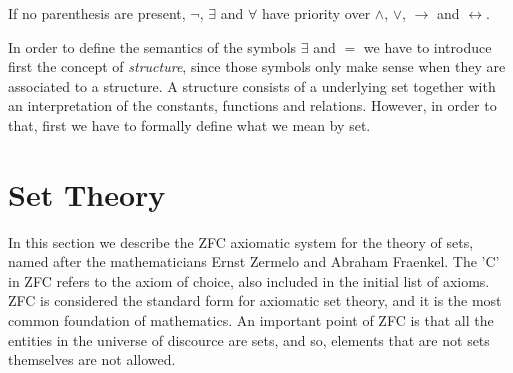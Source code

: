 \begin{example}
\end{example}

If no parenthesis are present, $\lnot$, $\exists$ and $\forall$ have priority over $\land$, $\lor$, $\rightarrow$ and $\leftrightarrow$.

In order to define the semantics of the symbols $\exists$ and $=$ we have to introduce first the concept of \emph{structure}, since those symbols only make sense when they are associated to a structure. A structure consists of a underlying set together with an interpretation of the constants, functions and relations. However, in order to that, first we have to formally define what we mean by set.

%
%
\section{Set Theory}
\label{sec:set_theory}

In this section we describe the ZFC axiomatic system for the theory of sets, named after the mathematicians Ernst Zermelo and Abraham Fraenkel. The 'C' in ZFC refers to the axiom of choice, also included in the initial list of axioms. ZFC is considered the standard form for axiomatic set theory, and it is the most common foundation of mathematics. An important point of ZFC is that all the entities in the universe of discource are sets, and so, elements that are not sets themselves are not allowed.

